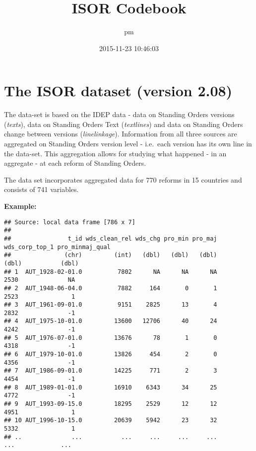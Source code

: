\documentclass[]{article}
\title{ISOR Codebook}
\author{pm}
\date{2015-11-23 10:46:03}
\newenvironment{Shaded}{\begin{snugshade}}{\end{snugshade}}
\newcommand{\KeywordTok}[1]{\textcolor[rgb]{0.13,0.29,0.53}{\textbf{{#1}}}}
\newcommand{\StringTok}[1]{\textcolor[rgb]{0.31,0.60,0.02}{{#1}}}
\newcommand{\NormalTok}[1]{{#1}}
\begin{document}
\maketitle

\section{The ISOR dataset (version
2.08)}\label{the-isor-dataset-version-2.08}

The data-set is based on the IDEP data - data on Standing Orders
versions (\emph{texts}), data on Standing Orders Text (\emph{textlines})
and data on Standing Orders change between versions
(\emph{linelinkage}). Information from all three sources are aggregated
on Standing Orders version level - i.e.~each version has its own line in
the data-set. This aggregation allows for studying what happened - in an
aggregate - at each reform of Standing Orders.

The data set incorporates aggregated data for 770 reforms in 15
countries and consists of 741 variables.

\textbf{Example:}

\begin{Shaded}
\end{Shaded}

\begin{verbatim}
## Source: local data frame [786 x 7]
## 
##                t_id wds_clean_rel wds_chg pro_min pro_maj wds_corp_top_1 pro_minmaj_qual
##               (chr)         (int)   (dbl)   (dbl)   (dbl)          (dbl)           (dbl)
## 1  AUT_1928-02-01.0          7802      NA      NA      NA           2530              NA
## 2  AUT_1948-06-04.0          7882     164       0       1           2523               1
## 3  AUT_1961-09-01.0          9151    2825      13       4           2832              -1
## 4  AUT_1975-10-01.0         13600   12706      40      24           4242              -1
## 5  AUT_1976-07-01.0         13676      78       1       0           4318              -1
## 6  AUT_1979-10-01.0         13826     454       2       0           4356              -1
## 7  AUT_1986-09-01.0         14225     771       2       3           4454              -1
## 8  AUT_1989-01-01.0         16910    6343      34      25           4772              -1
## 9  AUT_1993-09-15.0         18295    2529      12      12           4951               1
## 10 AUT_1996-10-15.0         20639    5942      23      32           5332               1
## ..              ...           ...     ...     ...     ...            ...             ...
\end{verbatim}
\end{document}
